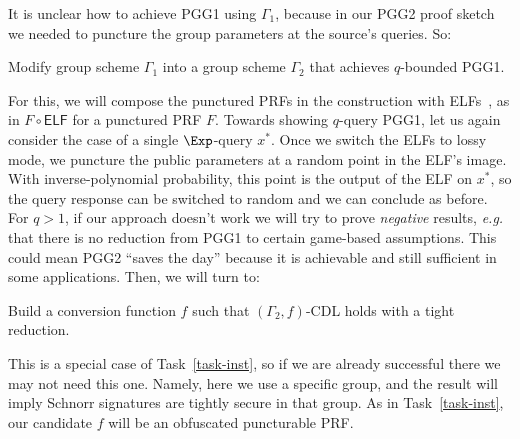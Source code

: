 It is unclear how to achieve PGG1 using $\Gamma_1$, because in our PGG2 proof sketch we needed to puncture the group parameters at the source's queries. So:



\begin{task}
    Modify group scheme $\Gamma_1$ into a group scheme $\Gamma_2$ that achieves $q$-bounded  PGG1.
\end{task}
For this, we will compose the punctured PRFs in the construction with ELFs~\cite{C:Zhandry16}, as in  $F \circ \mathsf{ELF}$ for a punctured PRF $F$. Towards showing $q$-query PGG1, let us again consider the case of a single $\Exp$-query $x^*$. Once we switch the ELFs to lossy mode,  we puncture the public parameters at a random point in the ELF's image.  With inverse-polynomial probability, this point is the output of the ELF on $x^*$, so the query response can be switched to random and we can conclude as before. For $q >1$, if our approach doesn't work we will  try to prove \emph{negative} results, \emph{e.g.} that there is no reduction from PGG1 to certain game-based assumptions. This could mean PGG2 ``saves the day'' because it is achievable and still sufficient in some applications.
Then, we will turn to:
\begin{task} \label{task-cdl}
    Build a conversion function $f$ such that  $(\Gamma_2,f)$-CDL holds with a tight reduction. 
\end{task}
This is a special case of Task~\ref{task-inst}, so if we are already successful there we may not need this one. Namely,  here we use a specific group, and the result will imply Schnorr signatures are tightly secure in that group. As in Task~\ref{task-inst}, our candidate $f$ will be an  obfuscated puncturable PRF. %

